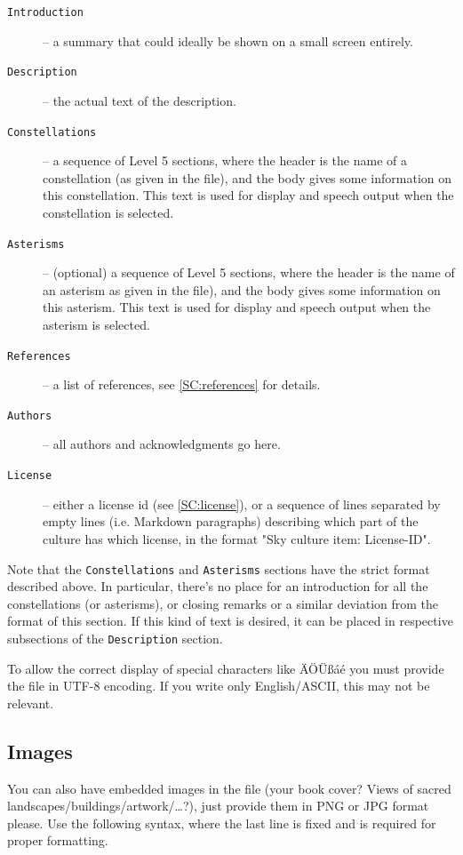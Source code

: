 \begin{description}
\item[\texttt{Introduction}] -- a summary that could ideally be shown on a small screen entirely.
\item[\texttt{Description}] -- the actual text of the description.
\item[\texttt{Constellations}] -- a sequence of Level 5 sections, where the header is the  name of a constellation (as given in the  file), and the body gives some information on this constellation. This text is used for display and speech output when the constellation is selected.
\item[\texttt{Asterisms}] -- (optional) a sequence of Level 5 sections, where the header is the  name of an asterism as given in the  file), and the body gives some information on this asterism. This text is used for display and speech output when the asterism is selected.
\item[\texttt{References}] -- a list of references, see \ref{SC:references} for details.
\item[\texttt{Authors}] -- all authors and acknowledgments go here.
\item[\texttt{License}] -- either a license id (see \ref{SC:license}), or a sequence of lines separated by empty lines (i.e. Markdown paragraphs) describing which part of the culture has which license, in the format "Sky culture item: License-ID".
\end{description}

Note that the \texttt{Constellations} and \texttt{Asterisms} sections have the strict format described above. 
In particular, there's no place for an introduction for all the constellations (or asterisms), 
or closing remarks or a similar deviation from the format of this section. 
If this kind of text is desired, it can be placed in respective subsections of the \texttt{Description} section.

To allow the correct display of special characters like ÄÖÜßáé you must provide the file in UTF-8 encoding. 
If you write only English/ASCII, this may not be relevant.


\subsection{Images}
\label{sec:skycultures:images}
\label{SC:images}

You can also have embedded images in the file (your book cover?
Views of sacred landscapes/buildings/artwork/\ldots?), just provide them in 
PNG or JPG format please. Use the following syntax, where the last line is fixed 
and is required for proper formatting. 


